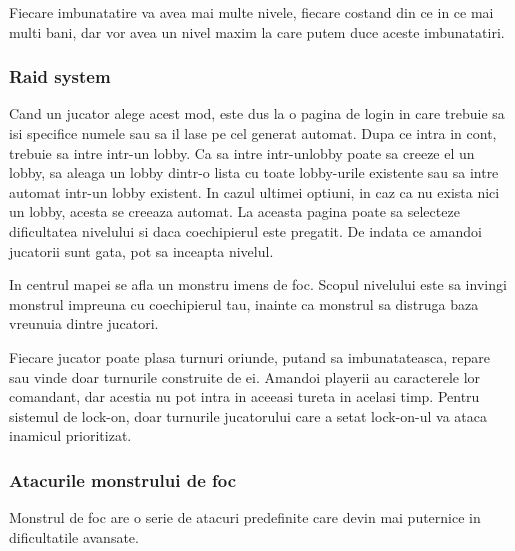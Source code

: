 \documentclass[12pt, a4paper]{article}
\begin{document}
	Fiecare imbunatatire va avea mai multe nivele, fiecare costand din ce in ce mai multi bani, dar vor avea un nivel maxim la care putem duce aceste imbunatatiri.
	
	
	
	\subsubsection{Raid system}
	
	Cand un jucator alege acest mod, este dus la o pagina de login in care trebuie sa isi specifice numele sau sa il lase pe cel generat automat. Dupa ce intra in cont, trebuie sa intre intr-un lobby. Ca sa intre intr-unlobby poate sa creeze el un lobby, sa aleaga un lobby dintr-o lista cu toate lobby-urile existente sau sa intre automat intr-un lobby existent. In cazul ultimei optiuni, in caz ca nu exista nici un lobby, acesta se creeaza automat. La aceasta pagina poate sa selecteze dificultatea nivelului si daca coechipierul este pregatit. De indata ce amandoi jucatorii sunt gata, pot sa inceapta nivelul.
	
	In centrul mapei se afla un monstru imens de foc. Scopul nivelului este sa invingi monstrul impreuna cu coechipierul tau, inainte ca monstrul sa distruga baza vreunuia dintre jucatori.

	Fiecare jucator poate plasa turnuri oriunde, putand sa imbunatateasca, repare sau vinde doar turnurile construite de ei. Amandoi playerii au caracterele lor comandant, dar acestia nu pot intra in aceeasi tureta in acelasi timp. Pentru sistemul de lock-on, doar turnurile jucatorului care a setat lock-on-ul va ataca inamicul prioritizat.
	
	\subsubsection{Atacurile monstrului de foc}
	
	Monstrul de foc are o serie de atacuri predefinite care devin mai puternice in dificultatile avansate.
	
\end{document}

